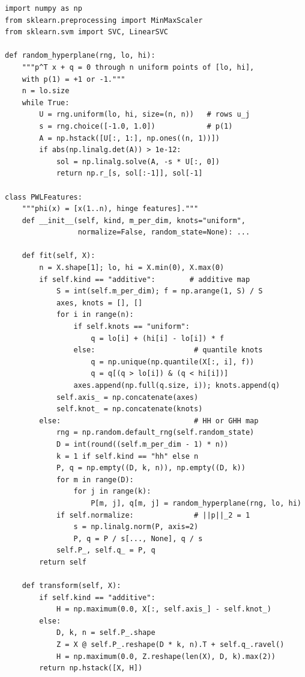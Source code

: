 \begin{lstlisting}
import numpy as np
from sklearn.preprocessing import MinMaxScaler
from sklearn.svm import SVC, LinearSVC

def random_hyperplane(rng, lo, hi):
    """p^T x + q = 0 through n uniform points of [lo, hi],
    with p(1) = +1 or -1."""
    n = lo.size
    while True:
        U = rng.uniform(lo, hi, size=(n, n))   # rows u_j
        s = rng.choice([-1.0, 1.0])            # p(1)
        A = np.hstack([U[:, 1:], np.ones((n, 1))])
        if abs(np.linalg.det(A)) > 1e-12:
            sol = np.linalg.solve(A, -s * U[:, 0])
            return np.r_[s, sol[:-1]], sol[-1]

class PWLFeatures:
    """phi(x) = [x(1..n), hinge features]."""
    def __init__(self, kind, m_per_dim, knots="uniform",
                 normalize=False, random_state=None): ...

    def fit(self, X):
        n = X.shape[1]; lo, hi = X.min(0), X.max(0)
        if self.kind == "additive":        # additive map
            S = int(self.m_per_dim); f = np.arange(1, S) / S
            axes, knots = [], []
            for i in range(n):
                if self.knots == "uniform":
                    q = lo[i] + (hi[i] - lo[i]) * f
                else:                       # quantile knots
                    q = np.unique(np.quantile(X[:, i], f))
                    q = q[(q > lo[i]) & (q < hi[i])]
                axes.append(np.full(q.size, i)); knots.append(q)
            self.axis_ = np.concatenate(axes)
            self.knot_ = np.concatenate(knots)
        else:                               # HH or GHH map
            rng = np.random.default_rng(self.random_state)
            D = int(round((self.m_per_dim - 1) * n))
            k = 1 if self.kind == "hh" else n
            P, q = np.empty((D, k, n)), np.empty((D, k))
            for m in range(D):
                for j in range(k):
                    P[m, j], q[m, j] = random_hyperplane(rng, lo, hi)
            if self.normalize:              # ||p||_2 = 1
                s = np.linalg.norm(P, axis=2)
                P, q = P / s[..., None], q / s
            self.P_, self.q_ = P, q
        return self

    def transform(self, X):
        if self.kind == "additive":
            H = np.maximum(0.0, X[:, self.axis_] - self.knot_)
        else:
            D, k, n = self.P_.shape
            Z = X @ self.P_.reshape(D * k, n).T + self.q_.ravel()
            H = np.maximum(0.0, Z.reshape(len(X), D, k).max(2))
        return np.hstack([X, H])


\end{lstlisting}
